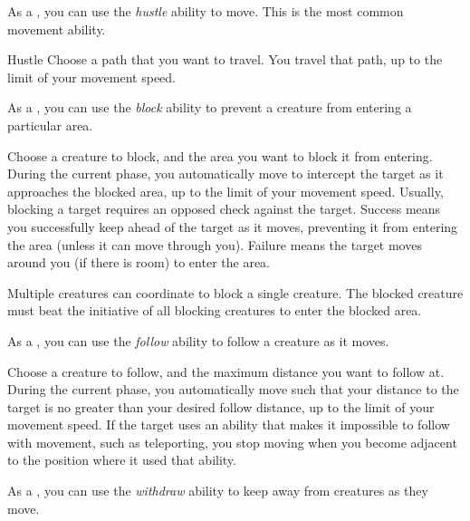          As a , you can use the \textit{hustle} ability to move.
        This is the most common movement ability.

        \begin{freeability}{Hustle}
            Choose a path that you want to travel.  You travel that path, up to the limit of your movement speed.
        \end{freeability}

         As a , you can use the \textit{block} ability to prevent a creature from entering a particular area.

        \begin{freeability}{}
            Choose a creature to block, and the area you want to block it from entering.
            During the current phase, you automatically move to intercept the target as it approaches the blocked area, up to the limit of your movement speed.
            Usually, blocking a target requires an opposed  check against the target.
            Success means you successfully keep ahead of the target as it moves, preventing it from entering the area (unless it can move through you).
            Failure means the target moves around you (if there is room) to enter the area.

            Multiple creatures can coordinate to block a single creature.
            The blocked creature must beat the initiative of all blocking creatures to enter the blocked area.
        \end{freeability}

         As a , you can use the \textit{follow} ability to follow a creature as it moves.

        \begin{freeability}{}
            Choose a creature to follow, and the maximum distance you want to follow at.
            During the current phase, you automatically move such that your distance to the target is no greater than your desired follow distance, up to the limit of your movement speed.
            If the target uses an ability that makes it impossible to follow with movement, such as teleporting, you stop moving when you become adjacent to the position where it used that ability.
        \end{freeability}

         As a , you can use the \textit{withdraw} ability to keep away from creatures as they move.

